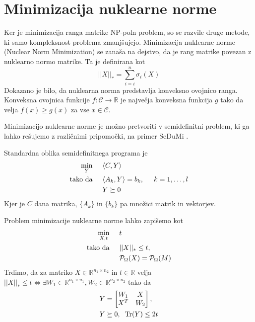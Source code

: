 \section{Minimizacija nuklearne norme}
Ker je minimizacija ranga matrike NP-poln problem, so se razvile druge metode, ki samo kompleksnost problema zmanjšujejo. Minimizacija nuklearne norme (Nuclear Norm Minimization) se zanaša na dejstvo, da je rang matrike povezan z nuklearno normo matrike. Ta je definirana kot
\[
  ||X||_* = \sum_{i = i}^{n} \sigma_i(X)
\] 
Dokazano je bilo, da nuklearna norma predstavlja konveksno ovojnico ranga. \cite{NNM-PHD} Konveksna ovojnica funkcije $f : \mathcal{C} \rightarrow \mathbb{R}$ je največja konveksna funkcija $g$ tako da velja $f(x) \geq g(x)$ za vse $x \in \mathcal{C}$. \cite{Survey-NKS19}

Minimizacijo nuklearne norme je možno pretvoriti v semidefinitni problem, ki ga lahko rešujemo z različnimi pripomočki, na primer SeDuMi \cite{SeDuMi}.

Standardna oblika semidefinitnega programa je
\begin{align*}
    \min_Y \hspace{0.5cm} &\langle C, Y \rangle \\
    \text{tako da} \hspace{0.5cm} &\langle A_k, Y \rangle = b_k, \hspace{0.5cm} k = 1, \hdots , l\\
    &Y \succeq 0
\end{align*}
Kjer je $C$ dana matrika, $\{A_k\}$ in $\{b_k\}$ pa množici matrik in vektorjev. 

Problem minimizacije nuklearne norme lahko zapišemo kot 
\begin{align*}
    \min_{X, t} \hspace{0.5cm} &t \\
    \text{tako da} \hspace{0.5cm} &||X||_* \leq t,\\
    &\mathcal{P}_\Omega(X) = \mathcal{P}_\Omega(M)
\end{align*}
Trdimo, da za matriko $X \in \mathbb{R}^{n_1 \times n_2}$ in $t \in \mathbb{R}$ 
velja $||X||_* \leq t \iff \exists W_1\in \mathbb{R}^{n_1 \times n_1}, W_2 \in \mathbb{R}^{n_2 \times n_2}$ tako da \cite{NNM-PHD} 
\begin{align*}
    &Y = \begin{bmatrix}
        W_1 & X \\
        X^T & W_2
    \end{bmatrix}, \\
    &Y \succeq 0, \hspace{0.2cm} \text{Tr}(Y) \leq 2t
\end{align*} 

